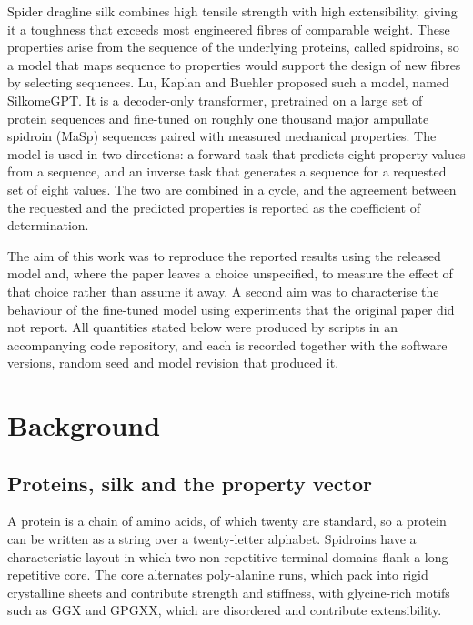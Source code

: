\documentclass[11pt,a4paper]{article}
\begin{document}
Spider dragline silk combines high tensile strength with high extensibility,
giving it a toughness that exceeds most engineered fibres of comparable weight.
These properties arise from the sequence of the underlying proteins, called
spidroins, so a model that maps sequence to properties would support the design
of new fibres by selecting sequences. Lu, Kaplan and Buehler \cite{lu2024}
proposed such a model, named SilkomeGPT. It is a decoder-only transformer,
pretrained on a large set of protein sequences and fine-tuned on roughly one
thousand major ampullate spidroin (MaSp) sequences paired with measured
mechanical properties. The model is used in two directions: a forward task that
predicts eight property values from a sequence, and an inverse task that
generates a sequence for a requested set of eight values. The two are combined
in a cycle, and the agreement between the requested and the predicted
properties is reported as the coefficient of determination.

The aim of this work was to reproduce the reported results using the released
model and, where the paper leaves a choice unspecified, to measure the effect of
that choice rather than assume it away. A second aim was to characterise the
behaviour of the fine-tuned model using experiments that the original paper did
not report. All quantities stated below were produced by scripts in an
accompanying code repository, and each is recorded together with the software
versions, random seed and model revision that produced it.

\section{Background}

\subsection{Proteins, silk and the property vector}

A protein is a chain of amino acids, of which twenty are standard, so a protein
can be written as a string over a twenty-letter alphabet. Spidroins have a
characteristic layout in which two non-repetitive terminal domains flank a long
repetitive core. The core alternates poly-alanine runs, which pack into rigid
crystalline sheets and contribute strength and stiffness, with glycine-rich
motifs such as GGX and GPGXX, which are disordered and contribute extensibility.
\end{document}
